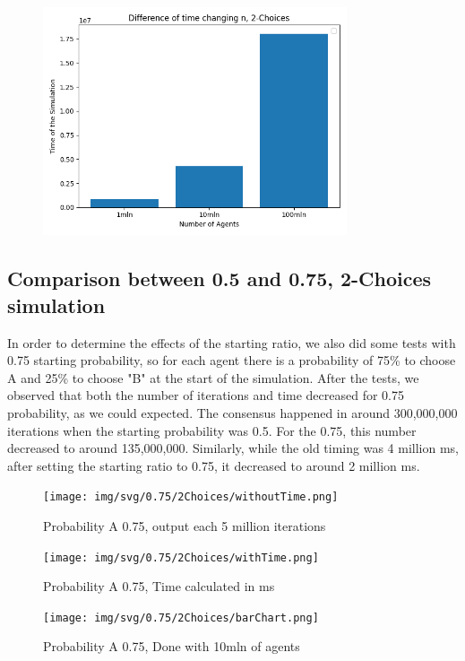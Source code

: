 \begin{figure}[H]
     \centering
     \includegraphics[width=0.80\textwidth,height=0.37\textheight]{img/svg/2Choices/TimeDifferenceN.png}
\end{figure}

\subsection[0.5-0.75 2Choices]{Comparison between 0.5 and 0.75, 2-Choices simulation}
In order to determine the effects of the starting ratio, we also did some tests with 0.75 starting probability, so for each agent there is a probability of 75\% to choose A and 25\% to choose "B" at the start of the simulation. After the tests, we observed that both the number of iterations and time decreased for 0.75 probability, as we could expected. The consensus happened in around 300,000,000 iterations when the starting probability was 0.5. For the 0.75, this number decreased to around 135,000,000. Similarly, while the old timing was 4 million ms, after setting the starting ratio to 0.75, it decreased to around 2 million ms.
\newpage
\begin{figure}[H]
     \centering
     \texttt{[image: img/svg/0.75/2Choices/withoutTime.png]}
     \caption{Probability A 0.75, output each 5 million iterations}
\end{figure}
\begin{figure}[H]
     \centering
     \texttt{[image: img/svg/0.75/2Choices/withTime.png]}
     \caption{Probability A 0.75, Time calculated in ms}
\end{figure}
\begin{figure}[H]
     \centering
     \texttt{[image: img/svg/0.75/2Choices/barChart.png]}
     \caption{Probability A 0.75, Done with 10mln of agents}
\end{figure}

